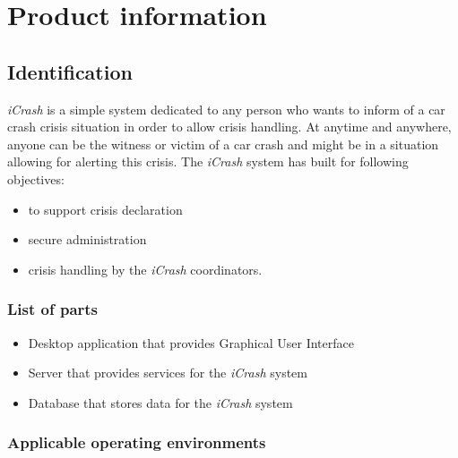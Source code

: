 \chapter{Product information}
\vspace{-6em}


\section{Identification}
\emph{iCrash} is a simple system dedicated to any person who wants to inform of
a car crash crisis situation in order to allow crisis handling. At anytime
and anywhere, anyone can be the witness or victim of a car crash and might be in
a situation allowing for alerting this crisis. The \emph{iCrash} system has
built for following objectives: 
\begin{itemize}
  \item to support crisis declaration 
  \item secure administration
  \item crisis handling by the \emph{iCrash} coordinators.
\end{itemize}

\subsection{List of parts}
\begin{itemize}
  \item Desktop application that provides Graphical User Interface
  \item Server that provides services for the \emph{iCrash} system
  \item Database that stores data for the \emph{iCrash} system
\end{itemize}

\subsection{Applicable operating environments}

